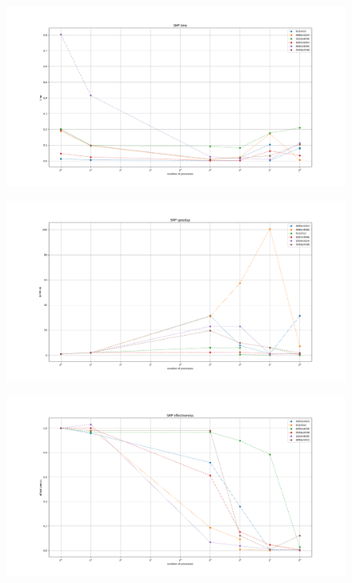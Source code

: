 \documentclass[14pt]{extarticle}
\begin{document}
\begin{figure}[H]
	\centering
	\includegraphics[scale=0.4]{SMP_time}
\end{figure}

\begin{figure}[H]
	\centering
	\includegraphics[scale=0.4]{SMP_speedup}
\end{figure}

\begin{figure}[H]
	\centering
	\includegraphics[scale=0.4]{SMP_effectiveness}
\end{figure}
\end{document}
